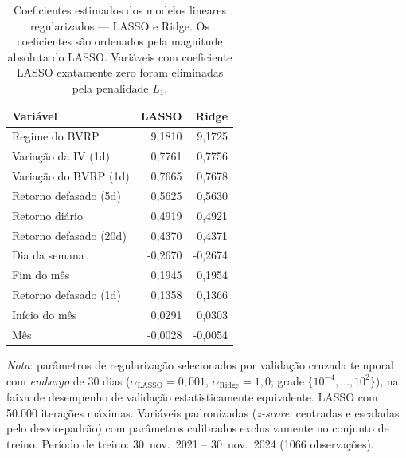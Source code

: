 \begin{table}[H]
\centering
\small
\caption{Coeficientes estimados dos modelos lineares regularizados --- LASSO e Ridge.
Os coeficientes são ordenados pela magnitude absoluta do LASSO.
Variáveis com coeficiente LASSO exatamente zero foram eliminadas pela penalidade $L_1$.}
\label{tab:cap8_coeficientes}
\begin{tabular}{lrr}
\toprule
Variável & LASSO & Ridge \\
\midrule
Regime do BVRP & 9,1810 & 9,1725 \\
Variação da IV (1d) & 0,7761 & 0,7756 \\
Variação do BVRP (1d) & 0,7665 & 0,7678 \\
Retorno defasado (5d) & 0,5625 & 0,5630 \\
Retorno diário & 0,4919 & 0,4921 \\
Retorno defasado (20d) & 0,4370 & 0,4371 \\
Dia da semana & -0,2670 & -0,2674 \\
Fim do mês & 0,1945 & 0,1954 \\
Retorno defasado (1d) & 0,1358 & 0,1366 \\
Início do mês & 0,0291 & 0,0303 \\
Mês & -0,0028 & -0,0054 \\
\bottomrule
\end{tabular}
\par\smallskip
\footnotesize\textit{Nota}: parâmetros de regularização selecionados por validação cruzada temporal com \textit{embargo} de 30 dias ($\alpha_{\text{LASSO}} = 0{,}001$, $\alpha_{\text{Ridge}} = 1{,}0$; grade $\{10^{-4}, \ldots, 10^{2}\}$), na faixa de desempenho de validação estatisticamente equivalente. LASSO com 50.000 iterações máximas. Variáveis padronizadas (\textit{z-score}: centradas e escaladas pelo desvio-padrão) com parâmetros calibrados exclusivamente no conjunto de treino. Período de treino: 30~nov.\ 2021 -- 30~nov.\ 2024 (1066 observações).
\end{table}